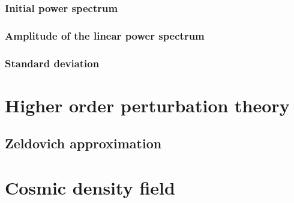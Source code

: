 \subsubsection{ Initial power spectrum }
\subsubsection{ Amplitude of the linear power spectrum }
\subsubsection{ Standard deviation }



\section{ Higher order perturbation theory }
\subsection{ Zeldovich approximation }


\section{ Cosmic density field }
